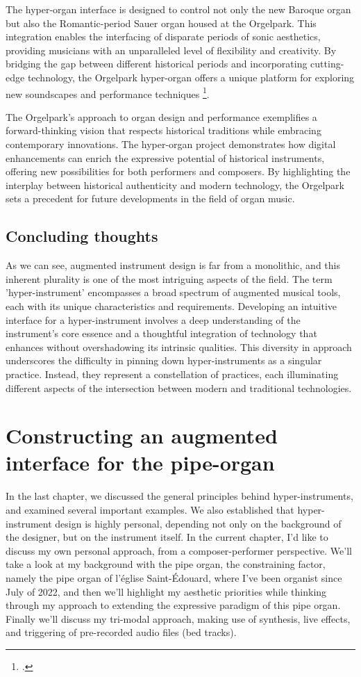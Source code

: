 \documentclass[12pt,twoside,maitrise]{dms_ks}
\theoremstyle{definition}
\begin{document}
The hyper-organ interface is designed to control not only the new Baroque organ but also the Romantic-period Sauer organ housed at the Orgelpark. 
This integration enables the interfacing of disparate periods of sonic aesthetics, providing musicians with an unparalleled level of flexibility and creativity. By bridging the gap between different historical periods and incorporating cutting-edge technology, the Orgelpark hyper-organ offers a unique platform for exploring new soundscapes and performance techniques \footcite{van_heumen_new_2014}.

The Orgelpark's approach to organ design and performance exemplifies a forward-thinking vision that respects historical traditions while embracing contemporary innovations. 
The hyper-organ project demonstrates how digital enhancements can enrich the expressive potential of historical instruments, offering new possibilities for both performers and composers. 
By highlighting the interplay between historical authenticity and modern technology, the Orgelpark sets a precedent for future developments in the field of organ music.

\section{Concluding thoughts}

As we can see, augmented instrument design is far from a monolithic, and this inherent plurality is one of the most intriguing aspects of the field.
The term 'hyper-instrument' encompasses a broad spectrum of augmented musical tools, each with its unique characteristics and requirements.
Developing an intuitive interface for a hyper-instrument involves a deep understanding of the instrument's core essence and a thoughtful integration of technology that enhances without overshadowing its intrinsic qualities.
This diversity in approach underscores the difficulty in pinning down hyper-instruments as a singular practice.
Instead, they represent a constellation of practices, each illuminating different aspects of the intersection between modern and traditional technologies.

\chapter{Constructing an augmented interface for the pipe-organ}

In the last chapter, we discussed the general principles behind hyper-instruments, and examined several important examples. 
We also established that hyper-instrument design is highly personal, depending not only on the background of the designer, but on the instrument itself. 
In the current chapter, I'd like to discuss my own personal approach, from a composer-performer perspective. We'll take a look at my background with the pipe organ, the constraining factor, namely the pipe organ of l'église Saint-Édouard, where I've been organist since July of 2022, and then we'll highlight my aesthetic priorities while thinking through my approach to extending the expressive paradigm of this pipe organ. Finally we'll discuss my tri-modal approach, making use of synthesis, live effects, and triggering of pre-recorded audio files (bed tracks). 
\end{document}
